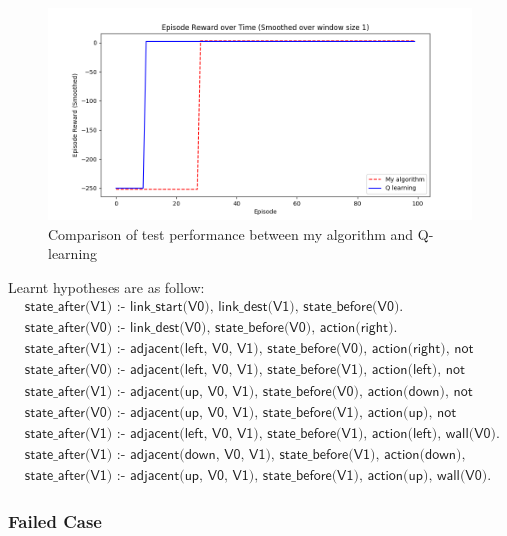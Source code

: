 \begin{figure}[!htb]
\centering
\includegraphics[width=1.0\textwidth]{./figures/experiment3_test}
\caption{Comparison of test performance between my algorithm and Q-learning}
\label{experiment3_test}
\end{figure}
       
Learnt hypotheses are as follow:
\begin{equation*}
\begin{split}
&\textsf{state\_after(V1) :- link\_start(V0), link\_dest(V1), state\_before(V0).}\\
&\textsf{state\_after(V0) :- link\_dest(V0), state\_before(V0), action(right).}\\
&\textsf{state\_after(V1) :- adjacent(left, V0, V1), state\_before(V0), action(right), not wall(V1).}\\
&\textsf{state\_after(V0) :- adjacent(left, V0, V1), state\_before(V1), action(left), not wall(V0).}\\
&\textsf{state\_after(V1) :- adjacent(up, V0, V1), state\_before(V0), action(down), not wall(V1).}\\
&\textsf{state\_after(V0) :- adjacent(up, V0, V1), state\_before(V1), action(up), not wall(V0).}\\
&\textsf{state\_after(V1) :- adjacent(left, V0, V1), state\_before(V1), action(left), wall(V0).}\\
&\textsf{state\_after(V1) :- adjacent(down, V0, V1), state\_before(V1), action(down), wall(V0).}\\
&\textsf{state\_after(V1) :- adjacent(up, V0, V1), state\_before(V1), action(up), wall(V0).}
\end{split}
\end{equation*}

\newpage
\subsubsection{Failed Case}


